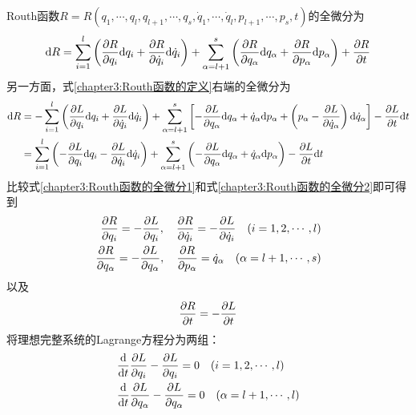 Routh函数$R=R(q_1,\cdots,q_l,q_{l+1},\cdots,q_s,\dot{q}_1,\cdots,\dot{q}_l,p_{l+1},\cdots,p_s,t)$的全微分为
\begin{equation}
	\mathrm{d} R = \sum_{i=1}^l \left(\frac{\partial R}{\partial q_i}\mathrm{d} q_i + \frac{\partial R}{\partial \dot{q}_i}\mathrm{d} \dot{q}_i\right) + \sum_{\alpha=l+1}^s \left(\frac{\partial R}{\partial q_\alpha} \mathrm{d} q_\alpha + \frac{\partial R}{\partial p_\alpha} \mathrm{d} p_\alpha\right) + \frac{\partial R}{\partial t}
	\label{chapter3:Routh函数的全微分1}
\end{equation}
另一方面，式\eqref{chapter3:Routh函数的定义}右端的全微分为
\begin{align}
	\mathrm{d} R & = -\sum_{i=1}^l \left(\frac{\partial L}{\partial q_i}\mathrm{d} q_i + \frac{\partial L}{\partial \dot{q}_i} \mathrm{d} \dot{q}_i\right) + \sum_{\alpha=l+1}^s \left[-\frac{\partial L}{\partial q_\alpha}\mathrm{d} q_\alpha + \dot{q}_\alpha\mathrm{d} p_\alpha + \left(p_\alpha-\frac{\partial L}{\partial \dot{q}_\alpha}\right) \mathrm{d} \dot{q}_\alpha\right] - \frac{\partial L}{\partial t}\mathrm{d} t \nonumber \\
	& = \sum_{i=1}^l \left(-\frac{\partial L}{\partial q_i}\mathrm{d} q_i - \frac{\partial L}{\partial \dot{q}_i} \mathrm{d} \dot{q}_i\right) + \sum_{\alpha=l+1}^s \left(-\frac{\partial L}{\partial q_\alpha}\mathrm{d} q_\alpha + \dot{q}_\alpha\mathrm{d} p_\alpha\right) - \frac{\partial L}{\partial t}\mathrm{d} t 
	\label{chapter3:Routh函数的全微分2}
\end{align}
比较式\eqref{chapter3:Routh函数的全微分1}和式\eqref{chapter3:Routh函数的全微分2}即可得到
\begin{align}
	\frac{\partial R}{\partial q_i} = -\frac{\partial L}{\partial q_i},\quad \frac{\partial R}{\partial \dot{q}_i} = -\frac{\partial L}{\partial \dot{q}_i}\quad (i=1,2,\cdots,l) \label{chapter3:Routh函数的全微分导出式1} \\
	\frac{\partial R}{\partial q_\alpha} = -\frac{\partial L}{\partial q_\alpha},\quad \frac{\partial R}{\partial p_\alpha} = \dot{q}_\alpha\quad (\alpha=l+1,\cdots,s) \label{chapter3:Routh函数的全微分导出式2}
\end{align}
以及
\begin{equation}
	\frac{\partial R}{\partial t} = -\frac{\partial L}{\partial t}
	\label{chapter3:Routh函数的全微分导出式3}
\end{equation}
将理想完整系统的Lagrange方程分为两组：
\begin{align}
	& \dfrac{\mathrm{d}}{\mathrm{d} t} \frac{\partial L}{\partial q_i} - \frac{\partial L}{\partial q_i} = 0\quad (i=1,2,\cdots,l) \label{chapter3:Routh方程节Lagrange方程分组1} \\
	& \dfrac{\mathrm{d}}{\mathrm{d} t} \frac{\partial L}{\partial q_\alpha} - \frac{\partial L}{\partial q_\alpha} = 0\quad (\alpha=l+1,\cdots,l) \label{chapter3:Routh方程节Lagrange方程分组2}
\end{align}
